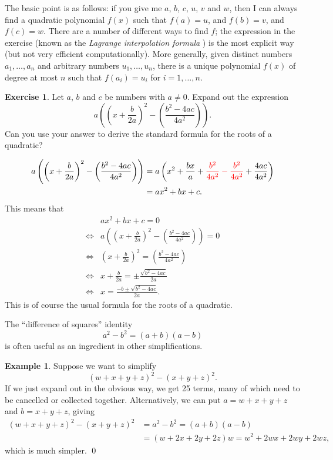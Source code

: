\documentclass[a4paper]{book}
\newcommand{\RED}[1]{{\color{red}#1}}
\newcommand{\PURPLE}[1]{{\color{purple}#1}}
\renewcommand{\:}{\colon}
\newcommand{\mathworld}[1]{}
\newcommand{\DEFN}[1]{\PURPLE{\emph{#1}}}
\theoremstyle{definition}
\newtheorem{example}[theorem]{Example}
\newtheorem{exercise}[theorem]{Exercise}
\renewenvironment{solution}{\SolutionInline}{\endSolutionInline}
\begin{document}
\begin{background}
 The basic point is as follows: if you give me $a$, $b$, $c$, $u$, $v$
 and $w$, then I can always find a quadratic polynomial $f(x)$ such
 that $f(a)=u$, and $f(b)=v$, and $f(c)=w$.  There are a number of
 different ways to find $f$; the expression in the exercise (known as
 the \DEFN{Lagrange interpolation formula}
 \mathworld{LagrangeInterpolatingPolynomial}) is the most explicit way
 (but not very efficient computationally).  More generally, given
 distinct numbers $a_1,\ldots,a_n$ and arbitrary numbers
 $u_1,\ldots,u_n$, there is a unique polynomial $f(x)$ of degree at
 most $n$ such that $f(a_i)=u_i$ for $i=1,\ldots,n$.
\end{background}

\begin{exercise}
 Let $a$, $b$ and $c$ be numbers with $a\neq 0$.  Expand out the
 expression
 \[ a\left(\left(x+\frac{b}{2a}\right)^2 -
     \left(\frac{b^2-4ac}{4a^2}\right)\right).
 \]
 Can you use your answer to derive the standard formula for the roots
 of a quadratic?
\end{exercise}
\begin{solution}
 \begin{align*}
  a\left(\left(x+\frac{b}{2a}\right)^2 -
    \left(\frac{b^2-4ac}{4a^2}\right)\right) &=
   a\left( x^2 + \frac{bx}{a} +
           \RED{ \frac{b^2}{4a^2} - \frac{b^2}{4a^2}}
            + \frac{4ac}{4a^2}\right) \\
    &= ax^2 + bx + c.
 \end{align*}
 This means that 
 \begin{align*}
       & ax^2 + bx + c = 0 \\
  \iff & a\left(\left(x+\frac{b}{2a}\right)^2 -
         \left(\frac{b^2-4ac}{4a^2}\right)\right) = 0 \\
  \iff & \left(x+\frac{b}{2a}\right)^2 =
         \left(\frac{b^2-4ac}{4a^2}\right) \\
  \iff & x+\frac{b}{2a} = \pm \frac{\sqrt{b^2-4ac}}{2a} \\
  \iff & x = \frac{-b \pm \sqrt{b^2-4ac}}{2a}.
 \end{align*}
 This is of course the usual formula for the roots of a quadratic.
\end{solution}


The ``difference of squares'' identity
\[ a^2 - b^2 = (a+b)(a-b) \]
is often useful as an ingredient in other simplifications.
\begin{example}
 Suppose we want to simplify
 \[ (w+x+y+z)^2 - (x+y+z)^2. \]
 If we just expand out in the obvious way, we get 25 terms, many of
 which need to be cancelled or collected together.  Alternatively, we
 can put $a=w+x+y+z$ and $b=x+y+z$, giving
 \begin{align*}
  (w+x+y+z)^2 - (x+y+z)^2 &= a^2-b^2 = (a+b)(a-b) \\
   &= (w+2x+2y+2z)w = w^2 + 2wx + 2wy + 2wz,
 \end{align*}
 which is much simpler. \qed
\end{example}
\end{document}
